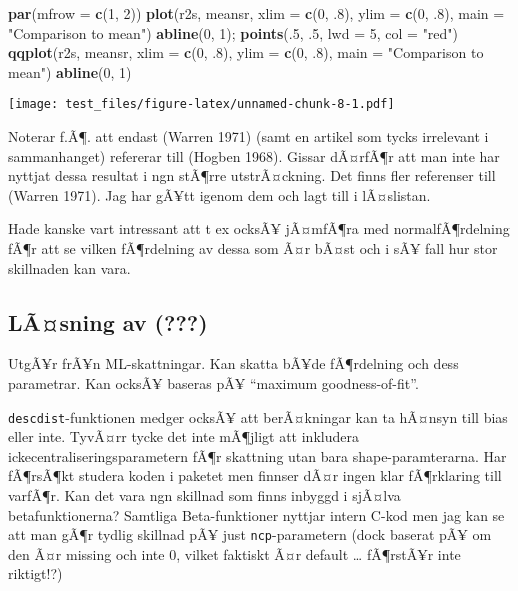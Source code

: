 \documentclass[]{article}
\newenvironment{Shaded}{\begin{snugshade}}{\end{snugshade}}
\newcommand{\KeywordTok}[1]{\textcolor[rgb]{0.13,0.29,0.53}{\textbf{{#1}}}}
\newcommand{\DataTypeTok}[1]{\textcolor[rgb]{0.13,0.29,0.53}{{#1}}}
\newcommand{\DecValTok}[1]{\textcolor[rgb]{0.00,0.00,0.81}{{#1}}}
\newcommand{\StringTok}[1]{\textcolor[rgb]{0.31,0.60,0.02}{{#1}}}
\newcommand{\NormalTok}[1]{{#1}}
\begin{document}
\begin{Shaded}
\begin{Highlighting}[]
\KeywordTok{par}\NormalTok{(}\DataTypeTok{mfrow =} \KeywordTok{c}\NormalTok{(}\DecValTok{1}\NormalTok{, }\DecValTok{2}\NormalTok{))}
\KeywordTok{plot}\NormalTok{(r2s, meansr, }\DataTypeTok{xlim =} \KeywordTok{c}\NormalTok{(}\DecValTok{0}\NormalTok{, .}\DecValTok{8}\NormalTok{), }\DataTypeTok{ylim =} \KeywordTok{c}\NormalTok{(}\DecValTok{0}\NormalTok{, .}\DecValTok{8}\NormalTok{), }\DataTypeTok{main =} \StringTok{"Comparison to mean"}\NormalTok{)}
  \KeywordTok{abline}\NormalTok{(}\DecValTok{0}\NormalTok{, }\DecValTok{1}\NormalTok{); }\KeywordTok{points}\NormalTok{(.}\DecValTok{5}\NormalTok{, .}\DecValTok{5}\NormalTok{, }\DataTypeTok{lwd =} \DecValTok{5}\NormalTok{, }\DataTypeTok{col =} \StringTok{"red"}\NormalTok{)}
\KeywordTok{qqplot}\NormalTok{(r2s, meansr, }\DataTypeTok{xlim =} \KeywordTok{c}\NormalTok{(}\DecValTok{0}\NormalTok{, .}\DecValTok{8}\NormalTok{), }\DataTypeTok{ylim =} \KeywordTok{c}\NormalTok{(}\DecValTok{0}\NormalTok{, .}\DecValTok{8}\NormalTok{), }\DataTypeTok{main =} \StringTok{"Comparison to mean"}\NormalTok{)}
  \KeywordTok{abline}\NormalTok{(}\DecValTok{0}\NormalTok{, }\DecValTok{1}\NormalTok{) }
\end{Highlighting}
\end{Shaded}

\texttt{[image: test\_files/figure-latex/unnamed-chunk-8-1.pdf]}

Noterar f.Ã¶. att endast (Warren 1971) (samt en artikel som tycks
irrelevant i sammanhanget) refererar till (Hogben 1968). Gissar dÃ¤rfÃ¶r
att man inte har nyttjat dessa resultat i ngn stÃ¶rre utstrÃ¤ckning. Det
finns fler referenser till (Warren 1971). Jag har gÃ¥tt igenom dem och
lagt till i lÃ¤slistan.

Hade kanske vart intressant att t ex ocksÃ¥ jÃ¤mfÃ¶ra med
normalfÃ¶rdelning fÃ¶r att se vilken fÃ¶rdelning av dessa som Ã¤r bÃ¤st
och i sÃ¥ fall hur stor skillnaden kan vara.

\subsection{\texorpdfstring{LÃ¤sning av
({\textbf{???}})}{LÃ¤sning av (???)}}\label{lasning-av-fitdistrplus}

UtgÃ¥r frÃ¥n ML-skattningar. Kan skatta bÃ¥de fÃ¶rdelning och dess
parametrar. Kan ocksÃ¥ baseras pÃ¥ ``maximum goodness-of-fit''.

\texttt{descdist}-funktionen medger ocksÃ¥ att berÃ¤kningar kan ta
hÃ¤nsyn till bias eller inte. TyvÃ¤rr tycke det inte mÃ¶jligt att
inkludera ickecentraliseringsparametern fÃ¶r skattning utan bara
shape-paramterarna. Har fÃ¶rsÃ¶kt studera koden i paketet men finnser
dÃ¤r ingen klar fÃ¶rklaring till varfÃ¶r. Kan det vara ngn skillnad som
finns inbyggd i sjÃ¤lva betafunktionerna? Samtliga Beta-funktioner
nyttjar intern C-kod men jag kan se att man gÃ¶r tydlig skillnad pÃ¥
just \texttt{ncp}-parametern (dock baserat pÃ¥ om den Ã¤r missing och
inte 0, vilket faktiskt Ã¤r default \ldots{} fÃ¶rstÃ¥r inte riktigt!?)
\end{document}
